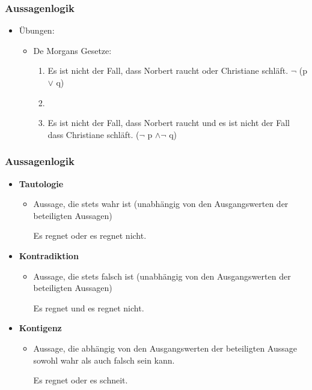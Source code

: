 \begin{frame}
\frametitle{Aussagenlogik}

\begin{itemize}
\item Übungen:

	\begin{itemize}
		\item De Morgans Gesetze:
	
		\begin{enumerate}
			\item Es ist nicht der Fall, dass Norbert raucht oder Christiane schläft. $\lnot$ (p $\lor$ q)
			\item[]
			\item Es ist nicht der Fall, dass Norbert raucht und es ist nicht der Fall dass Christiane schläft. ($\lnot$ p $\land \lnot$ q)
		\end{enumerate}
		
	\end{itemize}

\end{itemize}


\end{frame}



\begin{frame}
\frametitle{Aussagenlogik}

\begin{itemize}
	\item \textbf{Tautologie}
	
	\begin{itemize}
		\item Aussage, die stets wahr ist (unabhängig von den
Ausgangswerten der beteiligten Aussagen)
		
		\ea Es regnet oder es regnet nicht.
		\z
		
	\end{itemize}
	
	\item \textbf{Kontradiktion}
	
	\begin{itemize}
		\item  Aussage, die stets falsch ist (unabhängig von den
Ausgangswerten der beteiligten Aussagen)

		\ea Es regnet und es regnet nicht.
		\z
		
	\end{itemize}
	
	\item \textbf{Kontigenz}
	
	\begin{itemize}
		\item Aussage, die abhängig von den Ausgangswerten der beteiligten Aussage sowohl wahr als auch falsch sein kann.

		\ea Es regnet oder es schneit.
		\z

	\end{itemize}
	
\end{itemize}


\end{frame}


